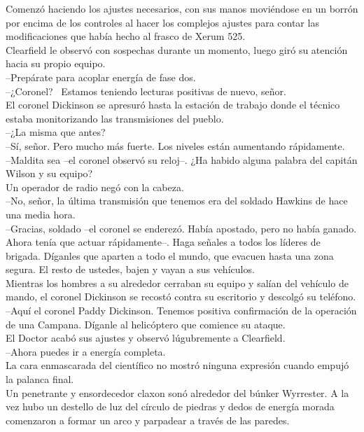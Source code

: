Comenzó haciendo los ajustes necesarios, con sus manos moviéndose en un
borrón por encima de los controles al hacer los complejos ajustes para
contar las modificaciones que había hecho al frasco de Xerum 525.\\
Clearfield le observó con sospechas durante un momento, luego giró su
atención hacia su propio equipo.\\
--Prepárate para acoplar energía de fase
dos.\\[2\baselineskip]--¿Coronel? ~Estamos teniendo lecturas positivas
de nuevo, señor.\\
El coronel Dickinson se apresuró hasta la estación de trabajo donde el
técnico estaba monitorizando las transmisiones del pueblo.\\
--¿La misma que antes?\\
--Sí, señor. Pero mucho más fuerte. Los niveles están aumentando
rápidamente.\\
--Maldita sea --el coronel observó su reloj--. ¿Ha habido alguna palabra
del capitán Wilson y su equipo?\\
Un operador de radio negó con la cabeza.\\
--No, señor, la última transmisión que tenemos era del soldado Hawkins
de hace una media hora.\\
--Gracias, soldado --el coronel se enderezó. Había apostado, pero no
había ganado. Ahora tenía que actuar rápidamente--. Haga señales a todos
los líderes de brigada. Díganles que aparten a todo el mundo, que
evacuen hasta una zona segura. El resto de ustedes, bajen y vayan a sus
vehículos.\\
Mientras los hombres a su alrededor cerraban su equipo y salían del
vehículo de mando, el coronel Dickinson se recostó contra su escritorio
y descolgó su teléfono.\\
--Aquí el coronel Paddy Dickinson. Tenemos positiva confirmación de la
operación de una Campana. Díganle al helicóptero que comience su
ataque.\\[2\baselineskip]El Doctor acabó sus ajustes y observó
lúgubremente a Clearfield.\\
--Ahora puedes ir a energía completa.\\
La cara enmascarada del científico no mostró ninguna expresión cuando
empujó la palanca final.\\[2\baselineskip]Un penetrante y ensordecedor
claxon sonó alrededor del búnker Wyrrester. A la vez hubo un destello de
luz del círculo de piedras y dedos de energía morada comenzaron a formar
un arco y parpadear a través de las paredes.\\
